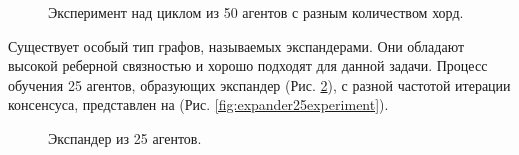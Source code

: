 \documentclass[a4paper,article,14pt]{extarticle}
\begin{document}
\begin{figure}[H]
\begin{center}
\caption{
\label{fig:cycle50agents}
     Эксперимент над циклом из 50 агентов с разным количеством хорд.}
\end{center}
\end{figure}

Существует особый тип графов, называемых экспандерами. Они обладают высокой реберной связностью и хорошо подходят для данной задачи. Процесс обучения 25 агентов, образующих экспандер (Рис. \ref{fig:expander25}), с разной частотой итерации консенсуса, представлен на (Рис. \ref{fig:expander25experiment}).

\begin{figure}[H]
\begin{center}
\caption{ \label{fig:expander25}
     Экспандер из 25 агентов.}
\end{center}
\end{figure}
\end{document}
